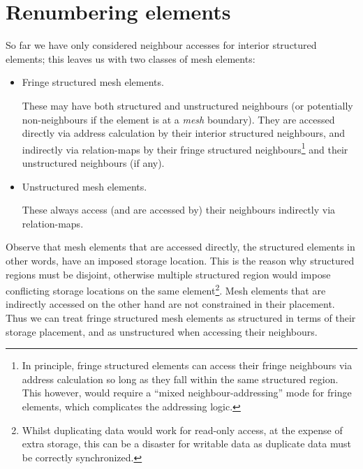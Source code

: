 \section{Renumbering elements}
\label{sec:renumbering-elements}
So far we have only considered neighbour accesses for interior structured elements; this leaves us with two classes of mesh elements:
\begin{itemize}
\item Fringe structured mesh elements.

These may have both structured and unstructured neighbours (or potentially non-neighbours if the element is at a \emph{mesh} boundary). They are accessed directly via address calculation by their interior structured neighbours, and indirectly via relation-maps by their fringe structured neighbours\footnote{In principle, fringe structured elements can access their fringe neighbours via address calculation so long as they fall within the same structured region. This however, would require a ``mixed neighbour-addressing'' mode for fringe elements, which complicates the addressing logic.} and their unstructured neighbours (if any).

\item Unstructured mesh elements.

These always access (and are accessed by) their neighbours indirectly via relation-maps.
\end{itemize}

Observe that mesh elements that are accessed directly, the structured elements in other words, have an imposed storage location. This is the reason why structured regions must be disjoint, otherwise multiple structured region would impose conflicting storage locations on the same element\footnote{Whilst duplicating data would work for read-only access, at the expense of extra storage, this can be a disaster for writable data as duplicate data must be correctly synchronized.}. Mesh elements that are indirectly accessed on the other hand are not constrained in their placement. Thus we can treat fringe structured mesh elements as structured in terms of their storage placement, and as unstructured when accessing their neighbours.

